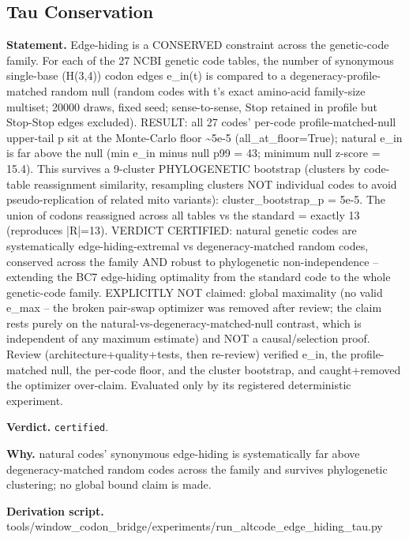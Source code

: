 \subsection{Tau Conservation}\label{sec:bridge-tau-conservation}
\textbf{Statement.} Edge-hiding is a CONSERVED constraint across the genetic-code family. For each of the 27 NCBI
genetic code tables, the number of synonymous single-base (H(3,4)) codon edges e\_in(t) is compared
to a degeneracy-profile-matched random null (random codes with t's exact amino-acid family-size
multiset; 20000 draws, fixed seed; sense-to-sense, Stop retained in profile but Stop-Stop edges
excluded). RESULT: all 27 codes' per-code profile-matched-null upper-tail p sit at the Monte-Carlo
floor \textasciitilde{}5e-5 (all\_at\_floor=True); natural e\_in is far above the null (min e\_in
minus null p99 = 43; minimum null z-score = 15.4). This survives a 9-cluster PHYLOGENETIC bootstrap
(clusters by code-table reassignment similarity, resampling clusters NOT individual codes to avoid
pseudo-replication of related mito variants): cluster\_bootstrap\_p = 5e-5. The union of codons
reassigned across all tables vs the standard = exactly 13 (reproduces |R|=13). VERDICT CERTIFIED:
natural genetic codes are systematically edge-hiding-extremal vs degeneracy-matched random codes,
conserved across the family AND robust to phylogenetic non-independence -- extending the BC7
edge-hiding optimality from the standard code to the whole genetic-code family. EXPLICITLY NOT
claimed: global maximality (no valid e\_max -- the broken pair-swap optimizer was removed after
review; the claim rests purely on the natural-vs-degeneracy-matched-null contrast, which is
independent of any maximum estimate) and NOT a causal/selection proof. Review
(architecture+quality+tests, then re-review) verified e\_in, the profile-matched null, the per-code
floor, and the cluster bootstrap, and caught+removed the optimizer over-claim. Evaluated only by its
registered deterministic experiment.

\textbf{Verdict.} \texttt{certified}.

\textbf{Why.} natural codes' synonymous edge-hiding is systematically far above degeneracy-matched random codes
across the family and survives phylogenetic clustering; no global bound claim is made.

\textbf{Derivation script.} tools/window\_codon\_bridge/experiments/run\_altcode\_edge\_hiding\_tau.py

